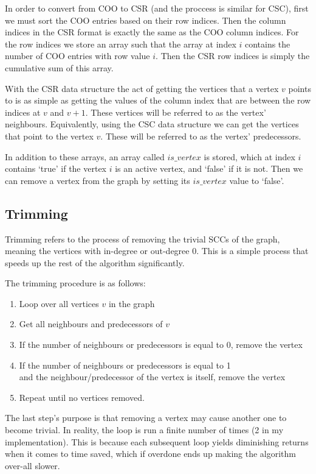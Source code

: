 \documentclass[10pt, a4paper]{article}
\begin{document}
In order to convert from COO to CSR (and the proccess is similar for CSC), first we must sort the
COO entries based on their row indices. Then the column indices in the CSR format is exactly the same
as the COO column indices. For the row indices we store an array such that the array at index $i$ contains
the number of COO entries with row value $i$. Then the CSR row indices is simply the cumulative sum of this
array.

With the CSR data structure the act of getting the vertices that a vertex $v$ points to is as simple as
getting the values of the column index that are between the row indices at $v$ and $v+1$. These vertices
will be referred to as the vertex' neighbours. Equivalently, using the CSC data structure we can get the
vertices that point to the vertex $v$. These will be referred to as the vertex' predecessors.

In addition to these arrays, an array called $is\_vertex$ is stored, which at index $i$ contains `true'
if the vertex $i$ is an active vertex, and `false' if it is not. Then we can remove a vertex from the 
graph by setting its $is\_vertex$ value to `false'.

\subsection{Trimming}	\label{trimming}
Trimming refers to the process of removing the trivial SCCs of the graph, meaning the vertices with in-degree
or out-degree 0. This is a simple process that speeds up the rest of the algorithm significantly.

The trimming procedure is as follows:
\begin{enumerate}
	\item Loop over all vertices $v$ in the graph
	\item Get all neighbours and predecessors of $v$
	\item If the number of neighbours or predecessors is equal to 0, remove the vertex
	\item If the number of neighbours or predecessors is equal to 1 \\
				and the neighbour/predecessor of the vertex is itself, remove the vertex
	\item Repeat until no vertices removed.
\end{enumerate}

The last step's purpose is that removing a vertex may cause another one to become trivial. In reality,
the loop is run a finite number of times (2 in my implementation). This is because each subsequent loop
yields diminishing returns when it comes to time saved, which if overdone ends up making the algorithm
over-all slower.
\end{document}
